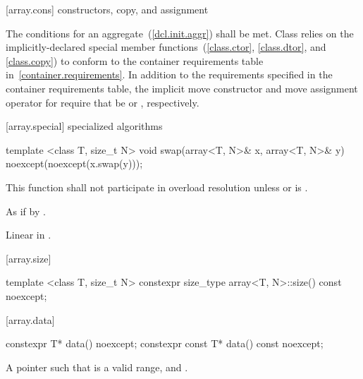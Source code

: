 [array.cons]{ constructors, copy, and assignment}

\pnum
{}%
%
The conditions for an aggregate~(\ref{dcl.init.aggr}) shall be
met. Class  relies on the implicitly-declared special
member functions~(\ref{class.ctor}, \ref{class.dtor}, and \ref{class.copy}) to
conform to the container requirements table in~\ref{container.requirements}.
In addition to the requirements specified in the container requirements table,
the implicit move constructor and move assignment operator for 
require that  be  or ,
respectively.

[array.special]{ specialized algorithms}

%
\begin{itemdecl}
template <class T, size_t N>
  void swap(array<T, N>& x, array<T, N>& y) noexcept(noexcept(x.swap(y)));
\end{itemdecl}

\begin{itemdescr}
\pnum\remarks
This function shall not participate in overload resolution
unless  or  is .

\pnum\effects
As if by .

\pnum
\complexity Linear in .
\end{itemdescr}

[array.size]{}

%
\begin{itemdecl}
template <class T, size_t N> constexpr size_type array<T, N>::size() const noexcept;
\end{itemdecl}

\begin{itemdescr}
\pnum\returns {}
\end{itemdescr}

[array.data]{}
%
\begin{itemdecl}
constexpr T* data() noexcept;
constexpr const T* data() const noexcept;
\end{itemdecl}

\begin{itemdescr}
\pnum \returns
A pointer such that  is a valid range, and
.
\end{itemdescr}

